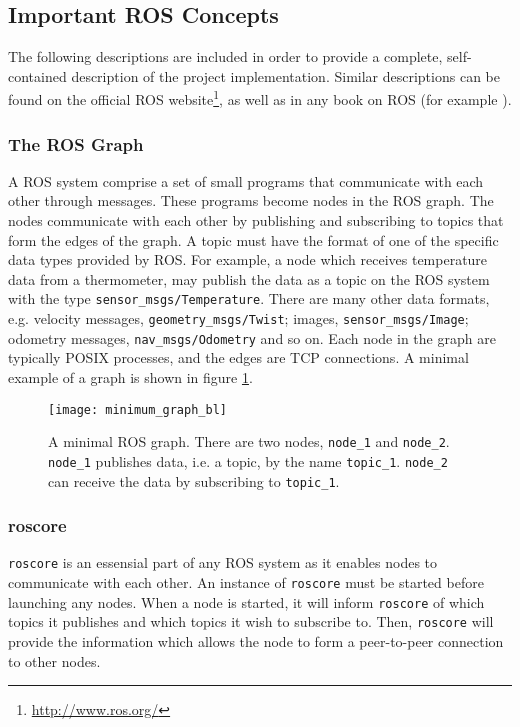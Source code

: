 \subsection{Important ROS Concepts}
\label{sec:ros_concepts}
The following descriptions are included in order to provide a complete, self-contained description of the project implementation. Similar descriptions can be found on the official \ac{ROS} website\footnote{\url{http://www.ros.org/}}, as well as in any book on \ac{ROS} (for example \cite{rosbook15}). 

\subsubsection{The ROS Graph}

A \ac{ROS} system comprise a set of small programs that communicate with each other through messages. These programs become nodes in the \ac{ROS} graph. The nodes communicate with each other by publishing and subscribing to topics that form the edges of the graph. A topic must have the format of one of the specific data types provided by \ac{ROS}. For example, a node which receives temperature data from a thermometer, may publish the data as a topic on the \ac{ROS} system with the type \texttt{sensor\_msgs/Temperature}. There are many other data formats, e.g. velocity messages, \texttt{geometry\_msgs/Twist}; images, \texttt{sensor\_msgs/Image}; odometry messages, \texttt{nav\_msgs/Odometry} and so on. Each node in the graph are typically POSIX processes, and the edges are TCP connections\cite{rosbook15}. A minimal example of a graph is shown in figure \ref{fig:minimum_graph}.

\begin{figure}[p]
    \centering
    \texttt{[image: minimum\_graph\_bl]}
    \caption{A minimal \ac{ROS} graph. There are two nodes, \texttt{node\_1} and \texttt{node\_2}. \texttt{node\_1} publishes data, i.e. a topic, by the name \texttt{topic\_1}. \texttt{node\_2} can receive the data by subscribing to \texttt{topic\_1}.}
    \label{fig:minimum_graph}
\end{figure}

\subsubsection{roscore}

\texttt{roscore} is an essensial part of any \ac{ROS} system as it enables nodes to communicate with each other. An instance of \texttt{roscore} must be started before launching any nodes. When a node is started, it will inform \texttt{roscore} of which topics it publishes and which topics it wish to subscribe to. Then, \texttt{roscore} will provide the information which allows the node to form a peer-to-peer connection to other nodes.

